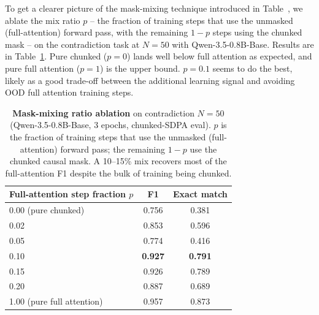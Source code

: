 To get a clearer picture of the mask-mixing technique introduced in Table~\claude{\ref{tab:maskmix}}, we ablate the mix ratio $p$ -- the fraction of training steps that use the unmasked (full-attention) forward pass, with the remaining $1-p$ steps using the chunked mask -- on the contradiction task at $N{=}50$ with Qwen-3.5-0.8B-Base. Results are in Table~\ref{tab:mask-mix-ablation}. Pure chunked ($p=0$) lands well below full attention as expected, and pure full attention ($p=1$) is the upper bound. $p=0.1$ seems to do the best, likely as a good trade-off between the additional learning signal and avoiding OOD full attention training steps. 

\begin{table}[ht]
\centering
\small
\begin{tabular}{lcc}
\toprule
Full-attention step fraction $p$ & F1 & Exact match \\
\midrule
0.00 (pure chunked) & 0.756 & 0.381 \\
0.02 & 0.853 & 0.596 \\
0.05 & 0.774 & 0.416 \\
0.10 & \textbf{0.927} & \textbf{0.791} \\
0.15 & 0.926 & 0.789 \\
0.20 & 0.887 & 0.689 \\
1.00 (pure full attention) & 0.957 & 0.873 \\
\bottomrule
\end{tabular}
\caption{\textbf{Mask-mixing ratio ablation} on contradiction $N{=}50$ (Qwen-3.5-0.8B-Base, 3 epochs, chunked-SDPA eval). $p$ is the fraction of training steps that use the unmasked (full-attention) forward pass; the remaining $1-p$ use the chunked causal mask. A 10--15\% mix recovers most of the full-attention F1 despite the bulk of training being chunked.}
\label{tab:mask-mix-ablation}
\end{table}
